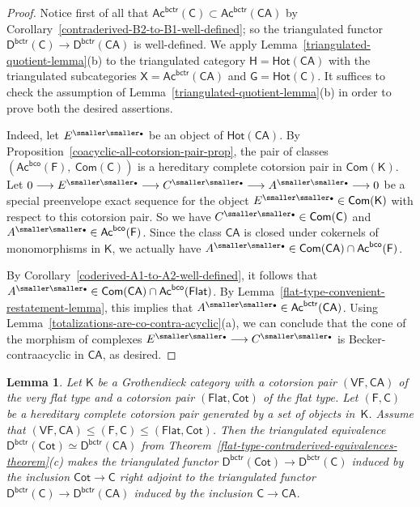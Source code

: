 \documentclass[12pt,a4paper]{amsart}
\newcommand{\+}{\nobreakdash-}
\renewcommand{\:}{\colon}
\newcommand{\rarrow}{\longrightarrow}
\newcommand{\bu}{{\text{\smaller\smaller$\scriptstyle\bullet$}}}
\newcommand{\sC}{\mathsf C}
\newcommand{\sD}{\mathsf D}
\newcommand{\sF}{\mathsf F}
\newcommand{\sG}{\mathsf G}
\newcommand{\sH}{\mathsf H}
\newcommand{\sK}{\mathsf K}
\newcommand{\sX}{\mathsf X}
\newcommand{\VF}{\mathsf{VF}}
\newcommand{\CA}{\mathsf{CA}}
\newcommand{\Flat}{\mathsf{Flat}}
\newcommand{\Cot}{\mathsf{Cot}}
\newcommand{\Hot}{\mathsf{Hot}}
\newcommand{\Com}{\mathsf{Com}}
\newcommand{\Ac}{\mathsf{Ac}}
\newcommand{\bco}{\mathsf{bco}}
\newcommand{\bctr}{\mathsf{bctr}}
\theoremstyle{plain}
\newtheorem{lem}[thm]{Lemma}
\theoremstyle{definition}
\begin{document}
\begin{proof}
 Notice first of all that $\Ac^\bctr(\sC)\subset\Ac^\bctr(\CA)$ by
Corollary~\ref{contraderived-B2-to-B1-well-defined}; so the triangulated
functor $\sD^\bctr(\sC)\rarrow\sD^\bctr(\CA)$ is well-defined.
 We apply Lemma~\ref{triangulated-quotient-lemma}(b) to the triangulated
category $\sH=\Hot(\CA)$ with the triangulated subcategories
$\sX=\Ac^\bctr(\CA)$ and $\sG=\Hot(\sC)$.
 It suffices to check the assumption of
Lemma~\ref{triangulated-quotient-lemma}(b) in order to prove both
the desired assertions.

 Indeed, let $E^\bu$ be an object of $\Hot(\CA)$.
 By Proposition~\ref{coacyclic-all-cotorsion-pair-prop}, the pair of
classes $(\Ac^\bco(\sF),\>\Com(\sC))$ is a hereditary complete cotorsion
pair in $\Com(\sK)$.
 Let $0\rarrow E^\bu\rarrow C^\bu\rarrow A^\bu\rarrow0$ be a special
preenvelope exact sequence for the object $E^\bu\in\Com(\sK)$ with
respect to this cotorsion pair.
 So we have $C^\bu\in\Com(\sC)$ and $A^\bu\in\Ac^\bco(\sF)$.
 Since the class $\CA$ is closed under cokernels of monomorphisms in
$\sK$, we actually have $A^\bu\in\Com(\CA)\cap\Ac^\bco(\sF)$.

 By Corollary~\ref{coderived-A1-to-A2-well-defined}, it follows that
$A^\bu\in\Com(\CA)\cap\Ac^\bco(\Flat)$.
 By Lemma~\ref{flat-type-convenient-restatement-lemma}, this implies
that $A^\bu\in\Ac^\bctr(\CA)$.
 Using Lemma~\ref{totalizations-are-co-contra-acyclic}(a), we can
conclude that the cone of the morphism of complexes $E^\bu\rarrow
C^\bu$ is Becker-contraacyclic in $\CA$, as desired.
\end{proof}

\begin{lem} \label{contraderived-Cot-C-CA-adjunction}
 Let\/ $\sK$ be a Grothendieck category with a cotorsion pair
$(\VF,\CA)$ of the very flat type and a cotorsion pair $(\Flat,\Cot)$
of the flat type.
 Let $(\sF,\sC)$ be a hereditary complete cotorsion pair generated by
a set of objects in\/~$\sK$.
 Assume that $(\VF,\CA)\le(\sF,\sC)\le(\Flat,\Cot)$.
 Then the triangulated equivalence\/
$\sD^\bctr(\Cot)\simeq\sD^\bctr(\CA)$ from
Theorem~\ref{flat-type-contraderived-equivalences-theorem}(c) makes
the triangulated functor\/ $\sD^\bctr(\Cot)\rarrow\sD^\bctr(\sC)$
induced by the inclusion\/ $\Cot\rarrow\sC$ right adjoint to
the triangulated functor\/ $\sD^\bctr(\sC)\rarrow\sD^\bctr(\CA)$
induced by the inclusion\/ $\sC\rarrow\CA$.
\end{lem}
\end{document}
